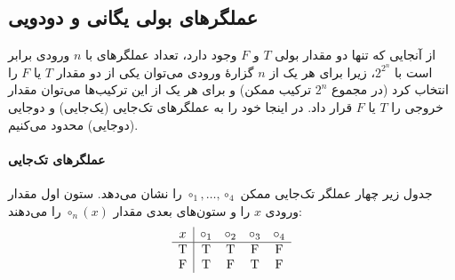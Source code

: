 \subsection*{ عملگرهای بولی یگانی و دودویی}
      از آنجایی که تنها دو مقدار بولی $T$ و $F$ وجود دارد، تعداد عملگرهای با $n$ ورودی برابر است با $2^{2^n}$، زیرا برای هر یک از $n$ گزارهٔ ورودی می‌توان یکی از دو مقدار $T$ یا $F$ را انتخاب کرد (در مجموع $2^n$ ترکیب ممکن) و برای هر یک از این ترکیب‌ها می‌توان مقدار خروجی را $T$ یا $F$ قرار داد. در اینجا خود را به عملگرهای تک‌جایی (یک‌جایی) و دو‌جایی (دو‌جایی) محدود می‌کنیم.
      \paragraph{عملگرهای تک‌جایی}
      جدول زیر چهار عملگر تک‌جایی ممکن $\circ_1,\dots,\circ_4$ را نشان می‌دهد. ستون اول مقدار ورودی $x$ را و ستون‌های بعدی مقدار $\circ_n(x)$ را می‌دهند:
      \[
      \begin{array}{c|cccc}
      x & \circ_1 & \circ_2 & \circ_3 & \circ_4\\\hline
      $T$ & $T$ & $T$ & $F$ & $F$\\
      $F$ & $T$ & $F$ & $T$ & $F$
      \end{array}
      \]
